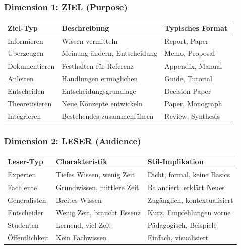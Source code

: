 \documentclass[12pt,a4paper]{article}
\begin{document}
\subsubsection{Dimension 1: ZIEL (Purpose)}

\begin{table}[htbp]
\centering
\begin{tabular}{@{}lp{6cm}l@{}}
\toprule
\textbf{Ziel-Typ} & \textbf{Beschreibung} & \textbf{Typisches Format} \\
\midrule
Informieren & Wissen vermitteln & Report, Paper \\
Überzeugen & Meinung ändern, Entscheidung & Memo, Proposal \\
Dokumentieren & Festhalten für Referenz & Appendix, Manual \\
Anleiten & Handlungen ermöglichen & Guide, Tutorial \\
Entscheiden & Entscheidungsgrundlage & Decision Paper \\
Theoretisieren & Neue Konzepte entwickeln & Paper, Monograph \\
Integrieren & Bestehendes zusammenführen & Review, Synthesis \\
\bottomrule
\end{tabular}
\end{table}

\subsubsection{Dimension 2: LESER (Audience)}

\begin{table}[htbp]
\centering
\begin{tabular}{@{}lp{4cm}p{5cm}@{}}
\toprule
\textbf{Leser-Typ} & \textbf{Charakteristik} & \textbf{Stil-Implikation} \\
\midrule
Experten & Tiefes Wissen, wenig Zeit & Dicht, formal, keine Basics \\
Fachleute & Grundwissen, mittlere Zeit & Balanciert, erklärt Neues \\
Generalisten & Breites Wissen & Zugänglich, kontextualisiert \\
Entscheider & Wenig Zeit, braucht Essenz & Kurz, Empfehlungen vorne \\
Studenten & Lernend, viel Zeit & Pädagogisch, Beispiele \\
Öffentlichkeit & Kein Fachwissen & Einfach, visualisiert \\
\bottomrule
\end{tabular}
\end{table}
\end{document}
